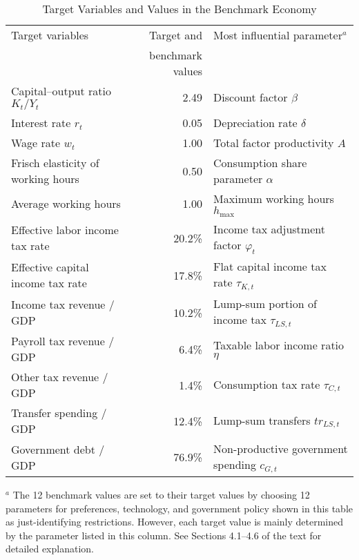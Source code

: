 \documentclass[11pt,leqno,fleqn]{article}
\begin{document}
\begin{table}[H]							
\caption{Target Variables and Values in the Benchmark Economy}							
\label{T:Targets}							
\begin{center}%
\begin{tabular*}{1.0\textwidth}{@{\extracolsep{\fill}}lrl}							
\hline\hline\vphantom{\rule{0pt}{12pt}}%
Target variables	&	Target and &	Most influential parameter$^{a}$	\\
	&	benchmark values	&		\\
\hline\vphantom{\rule{0pt}{12pt}}%
Capital--output ratio $K_{t}/Y_{t}$	&	2.49		&	Discount factor $\beta$	\\
Interest rate $r_{t}$	&	0.05		&	Depreciation rate $\delta$	\\
Wage rate $w_{t}$	&	1.00		&	Total factor productivity $A$	\\
Frisch elasticity of working hours	&	0.50		&	Consumption share parameter $\alpha$	\\
Average working hours	&	1.00		&	Maximum working hours $h_{\max}$	\\
\hline\vphantom{\rule{0pt}{12pt}}%
Effective labor income tax rate	&	20.2\%	&	Income tax adjustment factor $\varphi_{t}$	\\
Effective capital income tax rate	&	17.8\%	&	Flat capital income tax rate $\tau_{K,t}$	\\
Income tax revenue / GDP	&	10.2\%	&	Lump-sum portion of income tax $\tau_{LS,t}$	\\
Payroll tax revenue / GDP	&	6.4\%	&	Taxable labor income ratio $\eta$	\\
Other tax revenue / GDP	&	1.4\%	&	Consumption tax rate $\tau_{C,t}$	\\
Transfer spending / GDP	&	12.4\% &	Lump-sum transfers $tr_{LS,t}$	\\
Government debt / GDP	&	76.9\%	&	Non-productive government spending $c_{G,t}$	\\
\hline\hline							
\end{tabular*}							
\end{center}							
\small $^{a}$ The 12 benchmark values are set to their target values by choosing 12 parameters for preferences, technology, and government policy shown in this table as just-identifying restrictions. However, each target value is mainly determined by the parameter listed in this column. See Sections 4.1--4.6 of the text for detailed explanation.
\end{table}		
\end{document}
